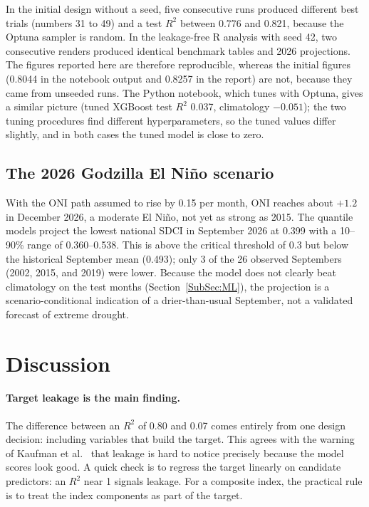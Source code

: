 \documentclass[11pt,twoside]{article}
\begin{document}
In the initial design without a seed, five consecutive runs produced different best trials (numbers 31 to 49) and a test $R^2$ between 0.776 and 0.821, because the Optuna sampler is random. In the leakage-free R analysis with seed 42, two consecutive renders produced identical benchmark tables and 2026 projections. The figures reported here are therefore reproducible, whereas the initial figures (0.8044 in the notebook output and 0.8257 in the report) are not, because they came from unseeded runs. The Python notebook, which tunes with Optuna, gives a similar picture (tuned XGBoost test $R^2$ 0.037, climatology $-0.051$); the two tuning procedures find different hyperparameters, so the tuned values differ slightly, and in both cases the tuned model is close to zero.

\subsection{The 2026 Godzilla El Ni\~no scenario}
\label{SubSec:Scenario}

With the ONI path assumed to rise by 0.15 per month, ONI reaches about $+1.2$ in December 2026, a moderate El Ni\~no, not yet as strong as 2015. The quantile models project the lowest national SDCI in September 2026 at 0.399 with a 10--90\% range of 0.360--0.538. This is above the critical threshold of 0.3 but below the historical September mean (0.493); only 3 of the 26 observed Septembers (2002, 2015, and 2019) were lower. Because the model does not clearly beat climatology on the test months (Section~\ref{SubSec:ML}), the projection is a scenario-conditional indication of a drier-than-usual September, not a validated forecast of extreme drought.

\section{Discussion}
\label{Sec:Discussion}

\paragraph{Target leakage is the main finding.} The difference between an $R^2$ of 0.80 and 0.07 comes entirely from one design decision: including variables that build the target. This agrees with the warning of Kaufman et al.\ \cite{kaufman2012leakage} that leakage is hard to notice precisely because the model scores look good. A quick check is to regress the target linearly on candidate predictors: an $R^2$ near 1 signals leakage. For a composite index, the practical rule is to treat the index components as part of the target.
\end{document}

